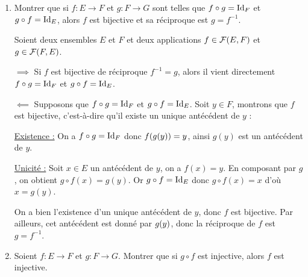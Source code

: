 \documentclass[a4paper,french,bookmarks]{book}
\begin{document}
\begin{enumerate}
        \item Montrer que si $f : E \to F$ et $g : F \to G$ sont telles que $f \circ g = \operatorname{Id}_F$ et $g \circ f = \operatorname{Id}_E$, alors $f$ est bijective et sa réciproque est $g = f^{-1}$.
        
        \noafter
        \nobefore
        \yesafter
        \begin{nproof}
            Soient deux ensembles $E$ et $F$ et deux applications $f \in \mathcal{F}\!\left(E, F\right)$ et $g \in \mathcal{F}\!\left(F, E\right)$.
            \begin{enumerate}
                \itt $\boxed{\implies}$ Si $f$ est bijective de réciproque $f^{-1} = g$, alors il vient directement $f \circ g = \operatorname{Id}_F$ et $g \circ f = \operatorname{Id}_E$.
                
                \itt $\boxed{\impliedby}$ Supposons que $f \circ g = \operatorname{Id}_F$ et $g \circ f = \operatorname{Id}_E$. Soit $y \in F$, montrons que $f$ est bijective, c'est-à-dire qu'il existe un unique antécédent de $y$ :
                
                \begin{enumerate}
                    \itarr \underline{Existence :} On a $f \circ g = \operatorname{Id}_F$ donc $f\!\left(g(y)\right) = y$, ainsi $g(y)$ est un antécédent de $y$.
                    
                    \itarr \underline{Unicité :} Soit $x \in E$ un antécédent de $y$, on a $f(x) = y$. En composant par $g$, on obtient $g \circ f(x) = g(y)$. Or $g \circ f = \operatorname{Id}_E$ donc $g \circ f(x) = x$ d'où $x = g(y)$.
                \end{enumerate}
            
                On a bien l'existence d'un unique antécédent de $y$, donc $f$ est bijective. Par ailleurs, cet antécédent est donné par $g\!\left(y\right)$, donc la réciproque de $f$ est $g = f^{-1}$.
            \end{enumerate}
        \end{nproof}
        \yesbefore
        
        \item Soient $f : E \to F$ et $g : F \to G$. Montrer que si $g \circ f$ est injective, alors $f$ est injective.
        

\end{enumerate}
\end{document}
